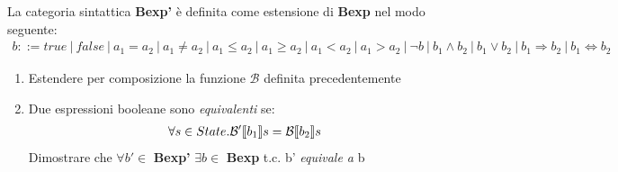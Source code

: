 {
La categoria sintattica \textbf{Bexp'} è definita come estensione di 
\textbf{Bexp} nel modo seguente:
\begin{align*}
b ::= true \
| \ false \ 
| \ a_1 = a_2 \
| \ a_1 \not = a_2 \
| \ a_1 \leq a_2 \
| \ a_1 \geq a_2 \
| \ a_1 < a_2 \
| \ a_1 > a_2 \
| \ \lnot b \
| \ b_1 \land b_2 \
| \ b_1 \lor b_2 \
| \ b_1 \Rightarrow b_2 \
| \ b_1 \Leftrightarrow b_2    
\end{align*}
\begin{enumerate}[label=(\alph*)]
  \item Estendere per composizione la funzione $\mathcal{B}$ definita 
precedentemente
  \item Due espressioni booleane sono \textit{equivalenti} se:  
    \begin{align*}
      \forall s \in State.\mathcal{B'} \llbracket b_1 \rrbracket s = \mathcal{B} \llbracket b_2 \rrbracket s
    \end{align*}
    Dimostrare che $\forall b' \in$ \textbf{Bexp'} $\exists b \in$ 
\textbf{Bexp} t.c. b' \textit{equivale a} b
\end{enumerate}
}%
